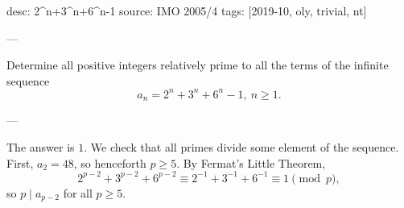 desc: 2^n+3^n+6^n-1
source: IMO 2005/4
tags: [2019-10, oly, trivial, nt]

---

Determine all positive integers relatively prime to all the terms of the infinite sequence \[a_n=2^n+3^n+6^n-1,\ n\ge 1.\]

---

The answer is $1$. We check that all primes divide some element of the sequence. First, $a_2=48$, so henceforth $p\ge5$. By Fermat's Little Theorem, \[2^{p-2}+3^{p-2}+6^{p-2}\equiv2^{-1}+3^{-1}+6^{-1}\equiv1\pmod p,\]
so $p\mid a_{p-2}$ for all $p\ge5$.


